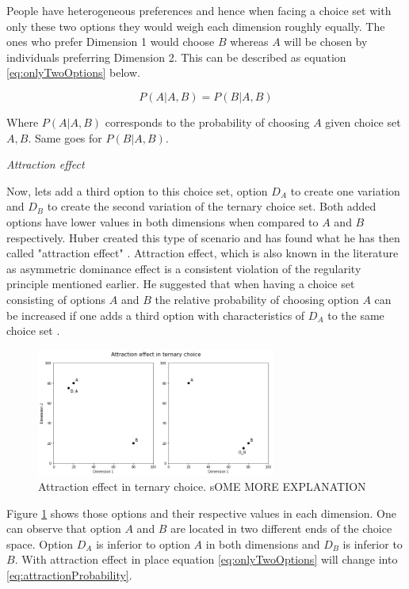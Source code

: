 \documentclass[a4paper,12pt]{article}
\newcommand{\citeyearonly}[1]{\citeyearpar{#1}}
\begin{document}
People have heterogeneous preferences and hence when facing a choice set with only these two options they would weigh each dimension roughly equally. The ones who prefer Dimension 1 would choose $B$ whereas $A$ will be chosen by individuals preferring Dimension 2. This can be described as equation \ref{eq:onlyTwoOptions} below.

\begin{equation}\label{eq:onlyTwoOptions}
    P(A|A,B) = P(B|A,B)
\end{equation}

Where $P(A|A,B)$ corresponds to the probability of choosing $A$ given choice set $A,B$. Same goes for $P(B|A,B)$.

\textit{Attraction effect}

Now, lets add a third option to this choice set, option $D_A$ to create one variation and $D_B$ to create the second variation of the ternary choice set. Both added options have lower values in both dimensions when compared to $A$ and $B$ respectively. Huber created this type of scenario and has found what he has then called "attraction effect" \citeyearonly{huberEtAl82}. Attraction effect, which is also known in the literature as asymmetric dominance effect is a consistent violation of the regularity principle mentioned earlier. He suggested that when having a choice set consisting of options $A$ and $B$ the relative probability of choosing option $A$ can be increased if one adds a third option with characteristics of $D_A$ to the same choice set \citeyearonly{huberEtAl82}.  

\begin{figure}[h]
    \centering
    \includegraphics[width=0.7\textwidth]{staticFiles/attractionEffect.png}
    \caption{Attraction effect in ternary choice. sOME MORE EXPLANATION} %
    \label{fig:attractionEffect} %

\end{figure}

Figure \ref{fig:attractionEffect} shows those options and their respective values in each dimension. One can observe that option $A$ and $B$ are located in two different ends of the choice space. Option $D_A$ is inferior to option $A$ in both dimensions and $D_B$ is inferior to $B$. With attraction effect in place equation  \ref{eq:onlyTwoOptions} will change into \ref{eq:attractionProbability}.
\end{document}
